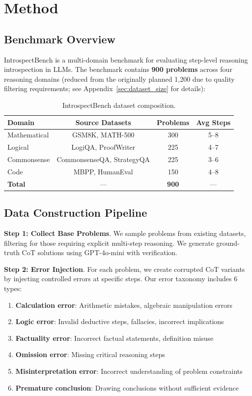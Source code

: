 \documentclass{article}
\begin{document}
\section{Method}

\subsection{Benchmark Overview}

IntrospectBench is a multi-domain benchmark for evaluating step-level reasoning introspection in LLMs. The benchmark contains \textbf{900 problems} across four reasoning domains (reduced from the originally planned 1,200 due to quality filtering requirements; see Appendix~\ref{sec:dataset_size} for details):

\begin{table}[h]
\caption{IntrospectBench dataset composition.}
\label{tab:dataset}
\centering
\begin{tabular}{lccc}
\toprule
\textbf{Domain} & \textbf{Source Datasets} & \textbf{Problems} & \textbf{Avg Steps} \\
\midrule
Mathematical & GSM8K, MATH-500 & 300 & 5--8 \\
Logical & LogiQA, ProofWriter & 225 & 4--7 \\
Commonsense & CommonsenseQA, StrategyQA & 225 & 3--6 \\
Code & MBPP, HumanEval & 150 & 4--8 \\
\midrule
\textbf{Total} & --- & \textbf{900} & --- \\
\bottomrule
\end{tabular}
\end{table}

\subsection{Data Construction Pipeline}

\textbf{Step 1: Collect Base Problems}. We sample problems from existing datasets, filtering for those requiring explicit multi-step reasoning. We generate ground-truth CoT solutions using GPT-4o-mini with verification.

\textbf{Step 2: Error Injection}. For each problem, we create corrupted CoT variants by injecting controlled errors at specific steps. Our error taxonomy includes 6 types:
\begin{enumerate}
    \item \textbf{Calculation error}: Arithmetic mistakes, algebraic manipulation errors
    \item \textbf{Logic error}: Invalid deductive steps, fallacies, incorrect implications
    \item \textbf{Factuality error}: Incorrect factual statements, definition misuse
    \item \textbf{Omission error}: Missing critical reasoning steps
    \item \textbf{Misinterpretation error}: Incorrect understanding of problem constraints
    \item \textbf{Premature conclusion}: Drawing conclusions without sufficient evidence
\end{enumerate}
\end{document}

